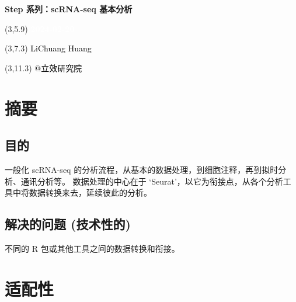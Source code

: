 \documentclass[
]{article}
\author{}
\date{\vspace{-2.5em}}
\begin{document}
\begin{titlepage} 
\begin{center} \textbf{\Huge Step 系列：scRNA-seq
基本分析} \vspace{4em}
\begin{textblock}{10}(3,5.9) \huge
\textbf{\textcolor{white}{2024-02-20}}
\end{textblock} \begin{textblock}{10}(3,7.3)
\Large \textcolor{black}{LiChuang Huang}
\end{textblock} \begin{textblock}{10}(3,11.3)
\Large \textcolor{black}{@立效研究院}
\end{textblock} \end{center} \end{titlepage}
\restoregeometry


\tableofcontents

\listoffigures

\listoftables

\newpage


\hypertarget{abstract}{%
\section{摘要}\label{abstract}}

\hypertarget{ux76eeux7684}{%
\subsection{目的}\label{ux76eeux7684}}

一般化 scRNA-seq 的分析流程，从基本的数据处理，到细胞注释，再到拟时分析、通讯分析等。
数据处理的中心在于 `Seurat'，以它为衔接点，从各个分析工具中将数据转换来去，延续彼此的分析。

\hypertarget{ux89e3ux51b3ux7684ux95eeux9898-ux6280ux672fux6027ux7684}{%
\subsection{解决的问题 (技术性的)}\label{ux89e3ux51b3ux7684ux95eeux9898-ux6280ux672fux6027ux7684}}

不同的 R 包或其他工具之间的数据转换和衔接。

\hypertarget{ux9002ux914dux6027}{%
\section{适配性}\label{ux9002ux914dux6027}}
\end{document}
